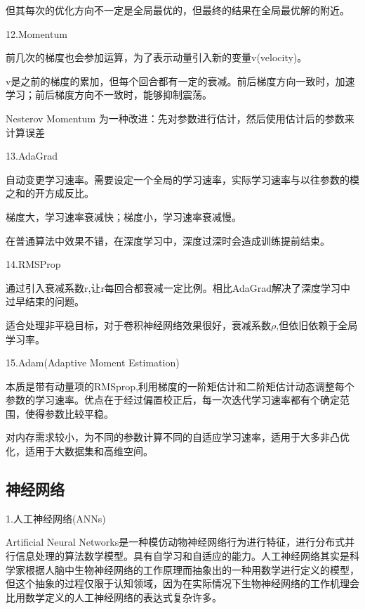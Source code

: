 \documentclass[openbib]{article}
\begin{document}
	但其每次的优化方向不一定是全局最优的，但最终的结果在全局最优解的附近。
	
	\begin{center}
		12.Momentum
	\end{center}
	
	前几次的梯度也会参加运算，为了表示动量引入新的变量v(velocity)。
	
	v是之前的梯度的累加，但每个回合都有一定的衰减。前后梯度方向一致时，加速学习；前后梯度方向不一致时，能够抑制震荡。
	
	Nesterov Momentum 为一种改进：先对参数进行估计，然后使用估计后的参数来计算误差
	
	\begin{center}
		13.AdaGrad
	\end{center}

	自动变更学习速率。需要设定一个全局的学习速率，实际学习速率与以往参数的模之和的开方成反比。
	
	梯度大，学习速率衰减快；梯度小，学习速率衰减慢。
	
	在普通算法中效果不错，在深度学习中，深度过深时会造成训练提前结束。
	
	\begin{center}
		14.RMSProp
	\end{center}

	通过引入衰减系数r,让r每回合都衰减一定比例。相比AdaGrad解决了深度学习中过早结束的问题。
	
	适合处理非平稳目标，对于卷积神经网络效果很好，衰减系数$\rho$,但依旧依赖于全局学习率。
	
	\begin{center}
		15.Adam(Adaptive Moment Estimation)
	\end{center}

	本质是带有动量项的RMSprop,利用梯度的一阶矩估计和二阶矩估计动态调整每个参数的学习速率。优点在于经过偏置校正后，每一次迭代学习速率都有个确定范围，使得参数比较平稳。
	
	对内存需求较小，为不同的参数计算不同的自适应学习速率，适用于大多非凸优化，适用于大数据集和高维空间。
	
	\subsection{神经网络}
	
		\begin{center}
		1.人工神经网络(ANNs)
		\end{center}
	
	Artificial Neural Networks是一种模仿动物神经网络行为进行特征，进行分布式并行信息处理的算法数学模型。具有自学习和自适应的能力。人工神经网络其实是科学家根据人脑中生物神经网络的工作原理而抽象出的一种用数学进行定义的模型，但这个抽象的过程仅限于认知领域，因为在实际情况下生物神经网络的工作机理会比用数学定义的人工神经网络的表达式复杂许多。
	
\end{document}
